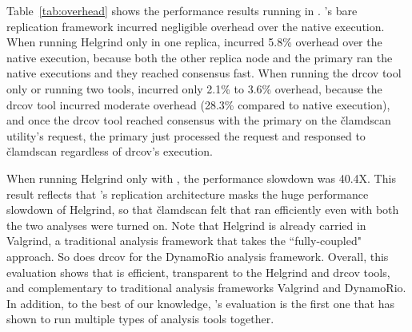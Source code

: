 Table~\ref{tab:overhead} shows the performance results running \clamav in 
\xxx. \xxx's bare replication framework incurred negligible overhead over 
the native execution. When running Helgrind only in one 
replica, \xxx incurred 5.8\% overhead over the native execution, because both 
the other replica node and the primary ran the native executions and they 
reached consensus fast. When running the drcov tool only or running two tools, 
\xxx incurred only 2.1\% to 3.6\% overhead, because the drcov tool incurred 
moderate overhead (28.3\% compared to native execution), and once the drcov 
tool reached consensus with the primary on the \v{clamdscan} utility's request, 
the primary just processed the request and responsed to \v{clamdscan} regardless 
of drcov's execution.

When running Helgrind only with \clamav, the performance slowdown was 40.4X. 
This result reflects that \xxx's replication architecture masks the huge 
performance slowdown of Helgrind, so that \v{clamdscan} felt that \clamav ran 
efficiently even with both the two analyses were turned on. Note that Helgrind is already carried in Valgrind, 
a traditional analysis framework that takes the ``fully-coupled" approach. So 
does drcov for the DynamoRio analysis framework. Overall, this evaluation shows 
that \xxx is efficient, transparent to the 
Helgrind and drcov tools, and complementary to traditional analysis frameworks 
Valgrind and DynamoRio. In addition, to the best of our knowledge, \xxx's 
evaluation is the first one that has shown to run multiple types of analysis 
tools together.
